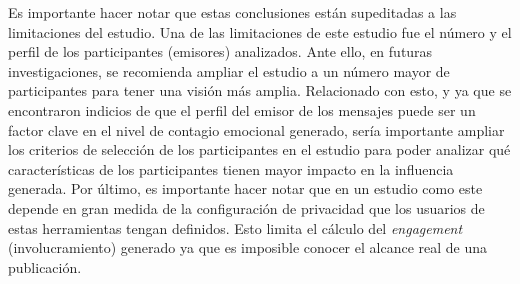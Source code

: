 \documentclass{textolivre}
\begin{document}
Es importante hacer notar que estas conclusiones están supeditadas a las limitaciones del estudio. Una de las limitaciones de este estudio fue el número y el perfil de los participantes (emisores) analizados. Ante ello, en futuras investigaciones, se recomienda ampliar el estudio a un número mayor de participantes para tener una visión más amplia. Relacionado con esto, y ya que se encontraron indicios de que el perfil del emisor de los mensajes puede ser un factor clave en el nivel de contagio emocional generado, sería importante ampliar los criterios de selección de los participantes en el estudio para poder analizar qué características de los participantes tienen mayor impacto en la influencia generada. Por último, es importante hacer notar que en un estudio como este depende en gran medida de la configuración de privacidad que los usuarios de estas herramientas tengan definidos. Esto limita el cálculo del \textit{engagement} (involucramiento) generado ya que es imposible conocer el alcance real de una publicación.


\printbibliography\label{sec-bib}
\end{document}
